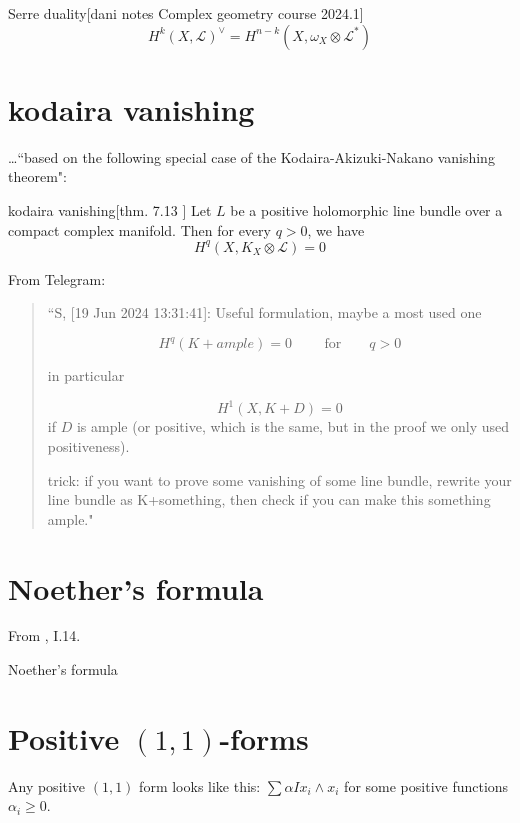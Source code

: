 \begin{thing6}{Serre duality}[dani notes Complex geometry course 2024.1]\leavevmode
\[H^{k}(X,\mathcal{L})^{\vee}=H^{n-k}(X,\omega_X \otimes \mathcal{L}^*)\]
\end{thing6}

\section{kodaira vanishing}
…``based on the following special case of the Kodaira-Akizuki-Nakano vanishing theorem":
\begin{thing6}{kodaira vanishing}[thm. 7.13 \cite{voi}]\label{thm:kodaira vanishing}\leavevmode
	Let \(L\) be a positive holomorphic line bundle over a compact complex manifold. Then for every \(q>0\), we have
	\[\boxed{H^{q}(X,K_X \otimes \mathcal{L})=0}\]
\end{thing6}

From Telegram:

\begin{quotation}
	``S, [19 Jun 2024 13:31:41]:
Useful formulation, maybe a most used one

\[H^q(K+ample) = 0 \qquad \text{ for}\qquad  q>0\]

in particular

\[H^1(X,K+D) = 0\] if \(D\) is ample (or positive, which is the same, but in the proof we only used positiveness).



trick: if you want to prove some vanishing of some line bundle, rewrite your line bundle as K+something, then check if you can make this something ample."
\end{quotation}
\section{Noether's formula}

From \cite{beauville}, I.14.

\begin{thing7}{Noether's formula}\leavevmode
\end{thing7}


\section{Positive \((1,1)\)-forms}
Any positive \((1,1)\) form looks like this: \(\sum \alpha I x_i \wedge x_i\) for some positive functions \(\alpha_i \geq 0\).

